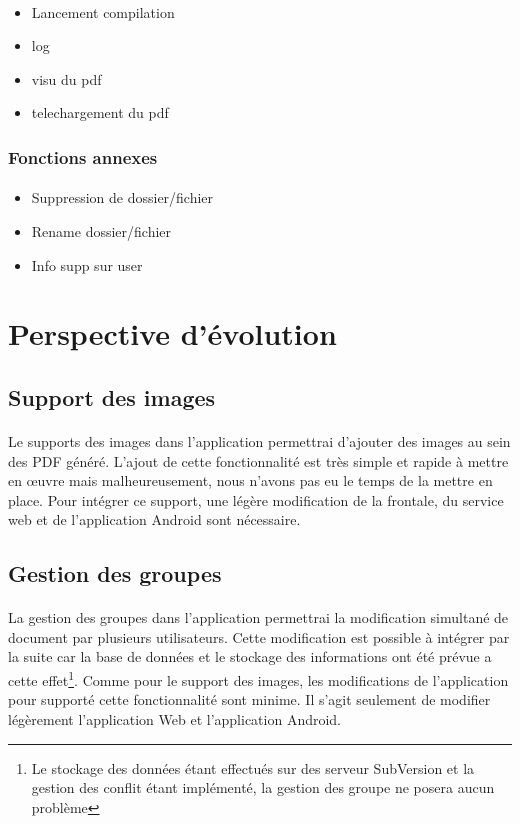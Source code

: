 \documentclass[a4paper,12pt]{article}
\begin{document}
\paragraph*{}
\begin{itemize}
 \item Lancement compilation
 \item log
 \item visu du pdf
 \item telechargement du pdf
\end{itemize}


\subsubsection{Fonctions annexes}
\paragraph*{}
\begin{itemize}
 \item Suppression de dossier/fichier
 \item Rename dossier/fichier
 \item Info supp sur user
\end{itemize}

\newpage
\section{Perspective d'évolution}
\subsection{Support des images}
\paragraph*{}
Le supports des images dans l'application permettrai d'ajouter des images au sein des PDF généré. L'ajout de cette fonctionnalité est très simple et rapide à mettre en \oe uvre mais malheureusement, nous n'avons pas eu le temps de la mettre en place. Pour intégrer ce support, une légère modification de la frontale, du service web et de l'application Android sont nécessaire.

\subsection{Gestion des groupes}
\paragraph*{}
La gestion des groupes dans l'application permettrai la modification simultané de document par plusieurs utilisateurs. Cette modification est possible à intégrer par la suite car la base de données et le stockage des informations ont été prévue a cette effet\footnote{Le stockage des données étant effectués sur des serveur SubVersion et la gestion des conflit étant implémenté, la gestion des groupe ne posera aucun problème}. Comme pour le support des images, les modifications de l'application pour supporté cette fonctionnalité sont minime. Il s'agit seulement de modifier légèrement l'application Web et l'application Android.
\end{document}
